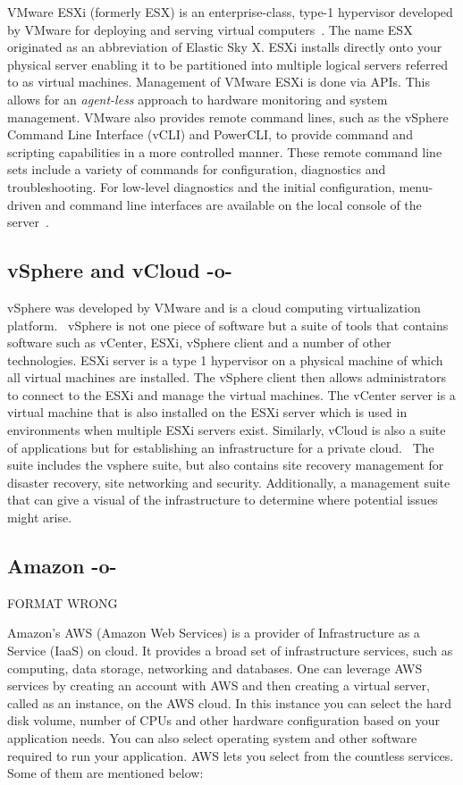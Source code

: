 VMware ESXi (formerly ESX) is an enterprise-class, type-1 hypervisor
developed by VMware for deploying and serving virtual
computers~\cite{wiki-vmwareESXi}. The name ESX originated as an
abbreviation of Elastic Sky X. ESXi installs directly onto your
physical server enabling it to be partitioned into multiple logical
servers referred to as virtual machines.  Management of VMware ESXi is
done via APIs. This allows for an \textit{agent-less} approach to
hardware monitoring and system management. VMware also provides remote
command lines, such as the vSphere Command Line Interface (vCLI) and
PowerCLI, to provide command and scripting capabilities in a more
controlled manner. These remote command line sets include a variety of
commands for configuration, diagnostics and troubleshooting. For
low-level diagnostics and the initial configuration, menu-driven and
command line interfaces are available on the local console of the
server~\cite{vmware-esxi}.
     
     
\subsection{vSphere and vCloud -o-}

vSphere was developed by VMware and is a cloud computing
virtualization platform.~\cite{www-vmware} vSphere is not one piece of
software but a suite of tools that contains software such as vCenter,
ESXi, vSphere client and a number of other technologies.  ESXi server
is a type 1 hypervisor on a physical machine of which all virtual
machines are installed.  The vSphere client then allows administrators
to connect to the ESXi and manage the virtual machines.  The vCenter
server is a virtual machine that is also installed on the ESXi server
which is used in environments when multiple ESXi servers exist.
Similarly, vCloud is also a suite of applications but for establishing
an infrastructure for a private cloud.~\cite{www-mustbegeek} The suite
includes the vsphere suite, but also contains site recovery management
for disaster recovery, site networking and security.  Additionally, a
management suite that can give a visual of the infrastructure to
determine where potential issues might arise.
     
\subsection{Amazon -o-}

FORMAT WRONG

Amazon's AWS (Amazon Web Services) is a provider of Infrastructure as
a Service (IaaS) on cloud. It provides a broad set of infrastructure
services, such as computing, data storage, networking and databases.
One can leverage AWS services by creating an account with AWS and then
creating a virtual server, called as an instance, on the AWS cloud.
In this instance you can select the hard disk volume, number of CPUs
and other hardware configuration based on your application needs.  You
can also select operating system and other software required to run
your application. AWS lets you select from the countless services.
Some of them are mentioned below:

